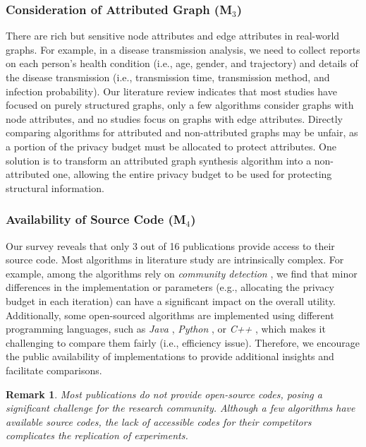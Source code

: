 \documentclass[conference]{IEEEtran}
\theoremstyle{plain}
\newtheorem{remark}{Remark}
\begin{document}
\subsubsection{Consideration of Attributed Graph (\textbf{M$_3$})}
There are rich but sensitive node attributes and edge attributes in real-world graphs.
For example, in a disease transmission analysis, we need to collect reports on each person's health condition (i.e., age, gender, and trajectory) and details of the disease transmission (i.e., transmission time, transmission method, and infection probability).
Our literature review indicates that most studies have focused on purely structured graphs, 
only a few algorithms \cite{chen2019publishing, jorgensen2016publishing, wei2020asgldp} consider graphs with node attributes, and no studies focus on graphs with edge attributes.
Directly comparing algorithms for attributed and non-attributed graphs may be unfair, as a portion of the privacy budget must be allocated to protect attributes. 
One solution is to transform an attributed graph synthesis algorithm into a non-attributed one, allowing the entire privacy budget to be used for protecting structural information.

\subsubsection{Availability of Source Code (\textbf{M$_4$})}
Our survey reveals that only 3 out of 16 publications provide access to their source code.
Most algorithms in literature study are intrinsically complex.
For example, among the algorithms \cite{yuan2023privgraph,ju2019generating,chen2019publishing,liu2020local} rely on \textit{community detection} \cite{nguyen2016detecting,mohamed2022differentially,fu2024community}, we find that minor differences in the implementation or parameters (e.g., allocating the privacy budget in each iteration) can have a significant impact on the overall utility.
Additionally, some open-sourced algorithms are implemented using different programming languages, such as \textit{Java} \cite{ye2020lf}, \textit{Python} \cite{yuan2023privgraph}, or \textit{C++} \cite{xiao2014differentially}, which makes it challenging to compare them fairly (i.e., efficiency issue).
Therefore, we encourage the public availability of implementations to provide additional insights and facilitate comparisons.

\begin{remark}
Most publications do not provide open-source codes, posing a significant challenge for the research community. 
Although a few algorithms \cite{xiao2014differentially,yuan2023privgraph} have available source codes, the lack of accessible codes for their competitors complicates the replication of experiments. 
\end{remark}
\end{document}
